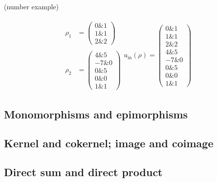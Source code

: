 \begin{example}{(number example)}
\begin{minipage}[t]{.5\textwidth}
\begin{align*}
\begin{array}{rr}
\rho_{1} &= \begin{pmatrix}
0 \ampersand 1 \\
1 \ampersand 1 \\
2 \ampersand 2
\end{pmatrix} \\
\\
\rho_{2} &= \begin{pmatrix}
4 \ampersand 5 \\
-7 \ampersand 0 \\
0 \ampersand 5 \\
0 \ampersand 0 \\
1 \ampersand 1
\end{pmatrix}
\end{array}
u_{\text{in}}(\rho) = \begin{pmatrix}
0 \ampersand 1 \\
1 \ampersand 1 \\
2 \ampersand 2 \\
4 \ampersand 5 \\
-7 \ampersand 0 \\
0 \ampersand 5 \\
0 \ampersand 0 \\
1 \ampersand 1
\end{pmatrix}
\end{align*}
\end{minipage}
\end{example}


\subsection{Monomorphisms and epimorphisms}

\subsection{Kernel and cokernel; image and coimage}

\subsection{Direct sum and direct product}